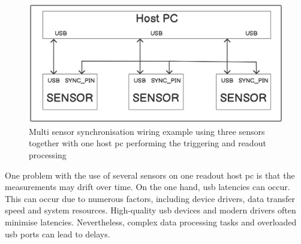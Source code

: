 \begin{figure}
\centering
\includegraphics{./generated_images/border_Multi_sensor_synchronisation_wiring_example_using_three_sensors_together_with_one_host_(+pc)_performing_the_triggering_and_readout_processing.png}
\caption{Multi sensor synchronisation wiring example using three sensors
together with one host \gls{pc} performing the triggering and readout
processing
\label{Multi_sensor_synchronisation_wiring_example_using_three_sensors_together_with_one_host_(+pc)_performing_the_triggering_and_readout_processing.png}}
\end{figure}

One problem with the use of several sensors on one readout host \gls{pc}
is that the measurements may drift over time. On the one hand, \gls{usb}
latencies can occur. This can occur due to numerous factors, including
device drivers, data transfer speed and system resources. High-quality
\gls{usb} devices and modern drivers often minimise
latencies. Nevertheless, complex data processing tasks and
overloaded \gls{usb} ports can lead to delays.

